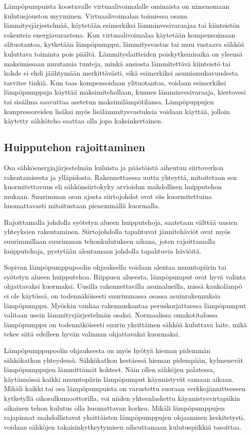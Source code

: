   Lämpöpumpuista koostuvalle virtuaalivoimalalle ominaista on nimenomaan kulutusjouston myyminen. Virtuaalivoimalan toimiessa osana lämmitysjärjestelmää, käytetään esimerkiksi lämminvesivaraajaa tai kiinteistön rakenteia energiavarastona. Kun virtuaalivoimalaa käytetään kompensoimaan alituotantoa, kytketään lämpöpumppu, lämmitysvastus tai muu vastaava sähköä kuluttava toiminta pois päältä. Lämmityslaitteiden poiskytkemisaika on yleensä maksimissaan muutamia tunteja, minkä ansiosta lämmitettävä kiinteistö tai kohde ei ehdi jäähtymään merkittävästi, eikä esimerkiksi asumismukavuudesta tarvitse tinkiä. Kun taas kompensoidaan ylituotantoa, voidaan esimerkiksi lämpöpumppuja käyttää maksimitehollaan, kunnes lämminvesivaraaja, kiertovesi tai sisäilma saavuttaa asetetun maksimilämpötilansa. Lämpöpuppujen kompressoreiden lisäksi myös lisälämmitysvastuksia voidaan käyttää, jolloin käytetty sähköteho saattaa olla jopa kaksinkertainen.

\subsection{Huipputehon rajoittaminen}

  Osa sähköenergiajärjestelmän kuluista ja päästöistä aiheutuu siirtoverkon rakentamisesta ja ylläpidosta. Rakennettaessa uutta yhteyttä, mitoitetaan sen kuormitettavuus eli sähkönsiirtokyky arvioidun mahdollisen huipputehon mukaan. Suurimman osan ajasta siirtojohdot ovat siis kuormitettuina huomattavasti mitoitustaan pienemmällä kuormalla.

  Rajoittamalla johdolla syötetyn alueen huipputehoja, saatetaan välttää uusien yhteyksien rakentaminen. Siirtojohdolla tapahtuvat jännitehäviöt ovat myös suurimmillaan suurimman tehonkulutuksen aikana, joten rajoittamalla huipputehoja, pystytään alentamaan johdolla tapahtuvia häviöitä.

  Sopivan lämpöpumppupoolin ohjauksella voidaan alentaa muuntopiirin tai syötetyn alueen huipputehoa. Riippuen alueesta, lämpöpumput ovat hyvä valinta ohjattavaksi kuormaksi. Uusilla rakennettavilla asuinalueilla, missä kaukolämpö ei ole käytössä, on todennäköisesti suurimmassa osassa asuinrakennuksia lämpöpumppu. Myöskin vanhaa rakennuskantaa peruskorjattaessa lämpöpumput valitaan usein lämmitysjärjestelmän osaksi. Normaalissa omakotitalossa lämpöpumppu on todennäköisesti suurin yksittäinen sähköä kuluttava laite, mikä tekee siitä edelleen hyvän valinnan ohjattavaksi kuormaksi.

  Lämpöpumppupoolin ohjauksesta on myös hyötyä hieman pidemmän sähkökatkon yhteydessä. Sähkökatkon kestäessä hieman pidempään, kylmenevät lämpöpumppujen lämmittämät kohteet. Näin ollen sähköjen palatessa, käytännössä kaikki muuntopiirin lämpöpumput käynnistyvät samaan aikaan. Mikäli kaikki tai osa lämpöpumpuista on varustettu suoraan verkkojännitteeseen kytketyllä oikosulkumoottorilla, voi niiden yhteenlaskettu käynnistysvirtapiikin aikainen tehon kulutus olla huomattavan korkea. Mikäli lämpöpumppujen rajapinnat mahdollistavat yksittäisten lämpöpumppujen ohjaamisen keskitetysti, voidaan sähköjen takaisinkytkeytymisen aiheuttamaan kulutuspiikkiä tasoittaa.

